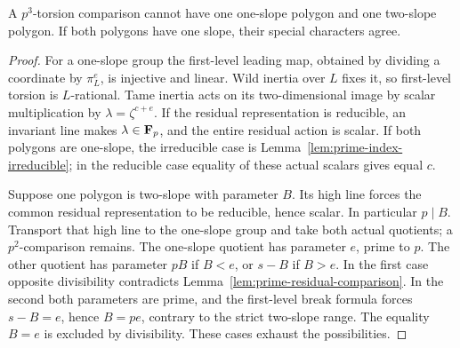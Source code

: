 \begin{lemma}\label{lem:one-slope-recovery}
A $p^3$-torsion comparison cannot have one one-slope polygon and one two-slope polygon. If both polygons have one slope, their special characters agree.
\end{lemma}
\begin{proof}
For a one-slope group the first-level leading map, obtained by dividing a coordinate by $\pi_L^e$, is injective and linear. Wild inertia over $L$ fixes it, so first-level torsion is $L$-rational. Tame inertia acts on its two-dimensional image by scalar multiplication by $\lambda=\zeta^{c+e}$. If the residual representation is reducible, an invariant line makes $\lambda\in\mathbf F_p$, and the entire residual action is scalar. If both polygons are one-slope, the irreducible case is Lemma~\ref{lem:prime-index-irreducible}; in the reducible case equality of these actual scalars gives equal $c$.

Suppose one polygon is two-slope with parameter $B$. Its high line forces the common residual representation to be reducible, hence scalar. In particular $p\mid B$. Transport that high line to the one-slope group and take both actual quotients; a $p^2$-comparison remains. The one-slope quotient has parameter $e$, prime to $p$. The other quotient has parameter $pB$ if $B<e$, or $s-B$ if $B>e$. In the first case opposite divisibility contradicts Lemma~\ref{lem:prime-residual-comparison}. In the second both parameters are prime, and the first-level break formula forces $s-B=e$, hence $B=pe$, contrary to the strict two-slope range. The equality $B=e$ is excluded by divisibility. These cases exhaust the possibilities.
\end{proof}

